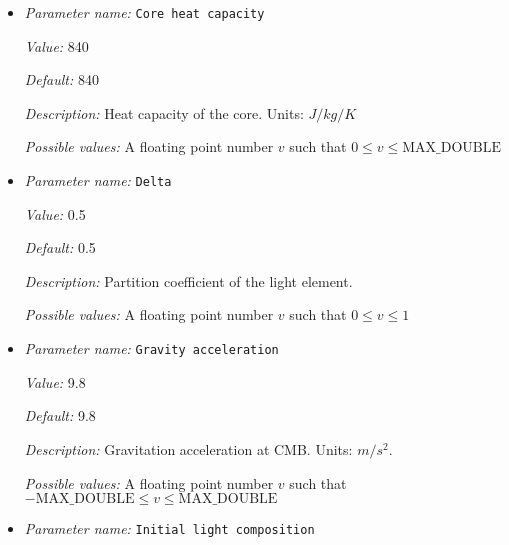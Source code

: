 \begin{itemize}
{\it Value:} 12.5e3


{\it Default:} 12.5e3


{\it Description:} Density of the core. Units: $kg/m^3$


{\it Possible values:} A floating point number $v$ such that $-\text{MAX\_DOUBLE} \leq v \leq \text{MAX\_DOUBLE}$
\item {\it Parameter name:} {\tt Core heat capacity}
\label{parameters:Boundary temperature model/Dynamic core/Core heat capacity}


{\it Value:} 840


{\it Default:} 840


{\it Description:} Heat capacity of the core. Units: $J/kg/K$


{\it Possible values:} A floating point number $v$ such that $0 \leq v \leq \text{MAX\_DOUBLE}$
\item {\it Parameter name:} {\tt Delta}
\label{parameters:Boundary temperature model/Dynamic core/Delta}


{\it Value:} 0.5


{\it Default:} 0.5


{\it Description:} Partition coefficient of the light element.


{\it Possible values:} A floating point number $v$ such that $0 \leq v \leq 1$
\item {\it Parameter name:} {\tt Gravity acceleration}
\label{parameters:Boundary temperature model/Dynamic core/Gravity acceleration}


{\it Value:} 9.8


{\it Default:} 9.8


{\it Description:} Gravitation acceleration at CMB. Units: $m/s^2$.


{\it Possible values:} A floating point number $v$ such that $-\text{MAX\_DOUBLE} \leq v \leq \text{MAX\_DOUBLE}$
\item {\it Parameter name:} {\tt Initial light composition}
\label{parameters:Boundary temperature model/Dynamic core/Initial light composition}



\end{itemize}
